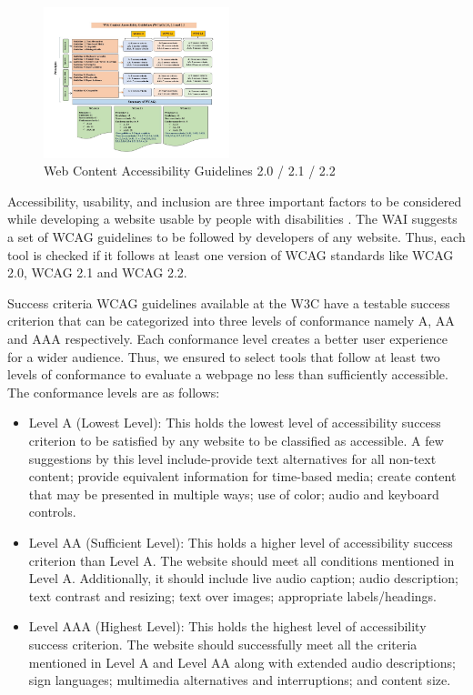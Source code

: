 \documentclass{IEEEtran}
\begin{document}
\begin{figure}[H]
    \includegraphics[width=0.48\textwidth]{images/figure2.png}
    \caption{ Web Content Accessibility Guidelines 2.0 / 2.1 / 2.2}
    \label{fig:figure2}
\end{figure}

Accessibility, usability, and inclusion are three important factors to be considered while developing a website usable by people with disabilities \cite{W3C2020}. The  WAI suggests a set of WCAG guidelines to be followed by developers of any website. Thus, each tool is checked if it follows at least one version of WCAG standards like WCAG 2.0, WCAG 2.1 and WCAG 2.2. 

Success criteria WCAG guidelines available at the W3C have a testable success criterion \cite{W3C2008} that can be categorized into three levels of conformance namely A, AA and AAA respectively. Each conformance level creates a better user experience for a wider audience. Thus, we ensured to select tools that follow at least two levels of conformance to evaluate a webpage no less than sufficiently accessible. The conformance levels are as follows:
\begin{itemize}
    \item Level A (Lowest Level): This holds the lowest level of accessibility success criterion to be satisfied by any website to be classified as accessible. A few suggestions by this level include-provide text alternatives for all non-text content; provide equivalent information for time-based media; create content that may be presented in multiple ways; use of color; audio and keyboard controls. 
    \item Level AA (Sufficient Level): This holds a higher level of accessibility success criterion than Level A. The website should meet all conditions mentioned in Level A. Additionally, it should include live audio caption; audio description; text contrast and resizing; text over images; appropriate labels/headings.
    \item Level AAA (Highest Level): This holds the highest level of accessibility success criterion. The website should successfully meet all the criteria mentioned in Level A and Level AA along with extended audio descriptions; sign languages; multimedia alternatives and interruptions; and content size.
\end{itemize} 
\end{document}
